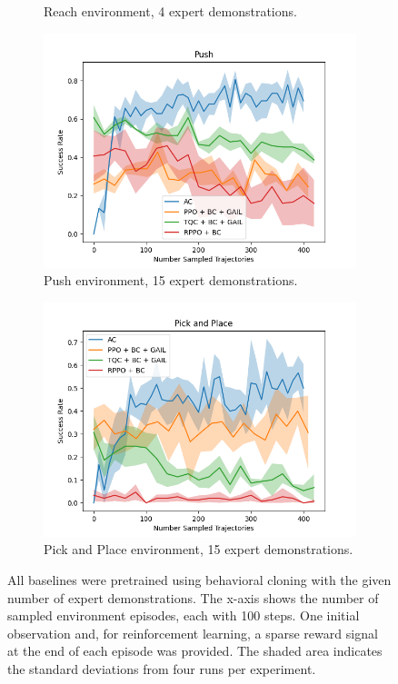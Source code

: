 \begin{figure}[htbp]
\begin{subfigure}[t]{0.45\textwidth}
    \caption{Reach environment, 4 expert demonstrations.}
    \label{fig:plot1}
  \end{subfigure}
  \medskip
  \begin{subfigure}[t]{0.45\textwidth}
    \includegraphics[width=\textwidth]{images/FineTuning/Push.png}
    \caption{Push environment, 15 expert demonstrations.}
    \label{fig:plot2}
  \end{subfigure}
  \begin{subfigure}[t]{0.45\textwidth}
    \includegraphics[width=\textwidth]{images/FineTuning/Pick and Place.png}
    \caption{Pick and Place environment, 15 expert demonstrations.}
    \label{fig:plot4}
  \end{subfigure}
  \caption{
    All baselines were pretrained using behavioral cloning with the given number of expert demonstrations. 
    The x-axis shows the number of sampled environment episodes, each with 100 steps. 
    One initial observation and, for reinforcement learning, a sparse reward signal at the end of each episode was provided. 
    The shaded area indicates the standard deviations from four runs per experiment.}
    \label{fig:finetuning}
\end{figure}

